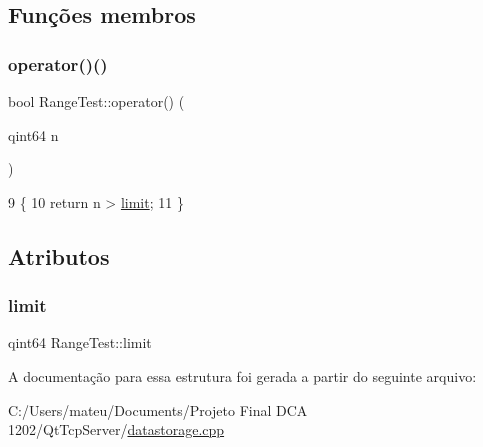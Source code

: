 \subsection{Funções membros}
\mbox{\label{struct_range_test_add496768a566e04219e840ee25e829d7}} 
\subsubsection{\texorpdfstring{operator()()}{operator()()}}
{\footnotesize\ttfamily bool Range\+Test\+::operator() (\begin{DoxyParamCaption}\item[{qint64}]{n }\end{DoxyParamCaption})\hspace{0.3cm}{\ttfamily [inline]}}


\begin{DoxyCode}
9                            \{
10     \textcolor{keywordflow}{return} n > \mbox{\hyperlink{struct_range_test_a638ebd61c0447db219f10cd1473ab364}{limit}};
11   \}
\end{DoxyCode}


\subsection{Atributos}
\mbox{\label{struct_range_test_a638ebd61c0447db219f10cd1473ab364}} 
\subsubsection{\texorpdfstring{limit}{limit}}
{\footnotesize\ttfamily qint64 Range\+Test\+::limit}



A documentação para essa estrutura foi gerada a partir do seguinte arquivo\+:\begin{DoxyCompactItemize}
\item 
C\+:/\+Users/mateu/\+Documents/\+Projeto Final D\+C\+A 1202/\+Qt\+Tcp\+Server/\mbox{\hyperlink{datastorage_8cpp}{datastorage.\+cpp}}\end{DoxyCompactItemize}
